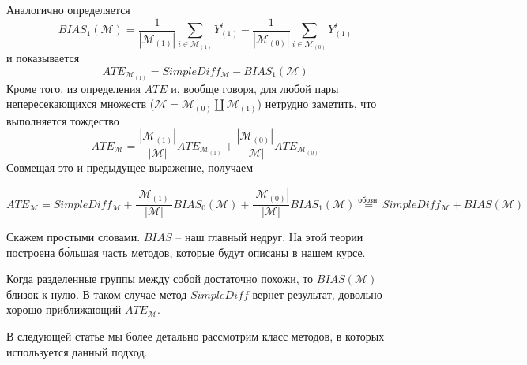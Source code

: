 \documentclass{article}
\begin{document}
        Аналогично определяется
        \[
            BIAS_1(\mathcal{M}) =
            \frac{1}{|\mathcal{M}_{(1)}|} \displaystyle\sum_{i\in\mathcal{M}_{(1)}}
            Y^i_{(1)} -
            \frac{1}{|\mathcal{M}_{(0)}|} \displaystyle\sum_{i\in\mathcal{M}_{(0)}}
            Y^i_{(1)}
        \]
        и показывается
        \[
            ATE_{\mathcal{M}_{(1)}} = SimpleDiff_\mathcal{M} - BIAS_1(\mathcal{M})
        \]
        Кроме того, из определения $ATE$ и, вообще говоря, для любой пары непересекающихся множеств ($\mathcal{M} = \mathcal{M}_{(0)} \amalg \mathcal{M}_{(1)}$) нетрудно заметить, что выполняется тождество
        \[
            ATE_\mathcal{M} =
            \frac{|\mathcal{M}_{(1)}|}{|\mathcal{M}|} ATE_{\mathcal{M}_{(1)} }+
            \frac{|\mathcal{M}_{(0)}|}{|\mathcal{M}|} ATE_{\mathcal{M}_{(0)}}
        \]
        Совмещая это и предыдущее выражение, получаем

        \[
            ATE_\mathcal{M} =
            SimpleDiff_\mathcal{M} +
            \frac{|\mathcal{M}_{(1)}|}{|\mathcal{M}|} BIAS_0(\mathcal{M}) +
            \frac{|\mathcal{M}_{(0)}|}{|\mathcal{M}|} BIAS_1(\mathcal{M})
            \stackrel{\text{обозн.}}{=}
            SimpleDiff_\mathcal{M} +
            BIAS(\mathcal{M})
        \]

        Скажем простыми словами.
        $BIAS$ -- наш главный недруг.
        На этой теории построена б\'{о}льшая часть методов, которые будут описаны в нашем курсе.

        Когда разделенные группы между собой достаточно похожи, то $BIAS(\mathcal{M})$ близок к нулю.
        В таком случае метод $SimpleDiff$ вернет результат, довольно хорошо приближающий $ATE_\mathcal{M}$.

        В следующей статье мы более детально рассмотрим класс методов, в которых используется данный подход.
\end{document}
